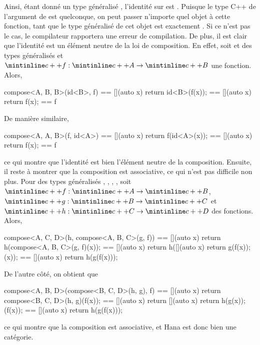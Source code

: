 Ainsi, étant donné un type généralisé , l'identité sur  est
. Puisque le type C++ de l'argument de  est quelconque,
on peut passer n'importe quel objet à cette fonction, tant que le type
généralisé de cet objet est exactement . Si ce n'est pas le cas,
le compilateur rapportera une erreur de compilation. De plus, il est clair
que l'identité est un élément neutre de la loi de composition. En effet, soit
 et  des types généralisés et $\cc{f} : \cc{A} \to \cc{B}$
une fonction. Alors,
\begin{cpp}
    compose<A, B, B>(id<B>, f) == [](auto x) { return id<B>(f(x)); }
                               == [](auto x) { return f(x); }
                               == f
\end{cpp}

De manière similaire,
\begin{cpp}
    compose<A, A, B>(f, id<A>) == [](auto x) { return f(id<A>(x)); }
                               == [](auto x) { return f(x); }
                               == f
\end{cpp}

ce qui montre que l'identité est bien l'élément neutre de la composition.
Ensuite, il reste à montrer que la composition est associative, ce qui n'est
pas difficile non plus. Pour des types généralisés , , ,
, soit $\cc{f} : \cc{A} \to \cc{B}$, $\cc{g} : \cc{B} \to \cc{C}$ et
$\cc{h} : \cc{C} \to \cc{D}$ des fonctions. Alors,
\begin{cpp}
    compose<A, C, D>(h, compose<A, B, C>(g, f))
        == [](auto x) { return h(compose<A, B, C>(g, f)(x)); }
        == [](auto x) { return h([](auto x) { return g(f(x)); }(x)); }
        == [](auto x) { return h(g(f(x))); }
\end{cpp}

De l'autre côté, on obtient que
\begin{cpp}
    compose<A, B, D>(compose<B, C, D>(h, g), f)
        == [](auto x) { return compose<B, C, D>(h, g)(f(x)); }
        == [](auto x) { return [](auto x) { return h(g(x)); }(f(x)); }
        == [](auto x) { return h(g(f(x))); }
\end{cpp}

ce qui montre que la composition est associative, et Hana est donc bien une
catégorie.
